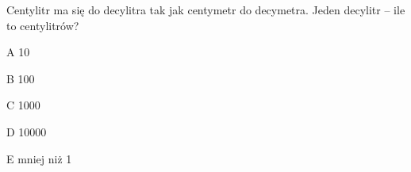 \begin{tresc}
Centylitr ma się do decylitra tak jak centymetr do decymetra. Jeden decylitr – ile to centylitrów?
\end{tresc}
\begin{wariant}{A} 10 \end{wariant}
\begin{wariant}{B} 100 \end{wariant}
\begin{wariant}{C} 1000 \end{wariant}
\begin{wariant}{D} 10000 \end{wariant}
\begin{wariant}{E} mniej niż 1 \end{wariant}
